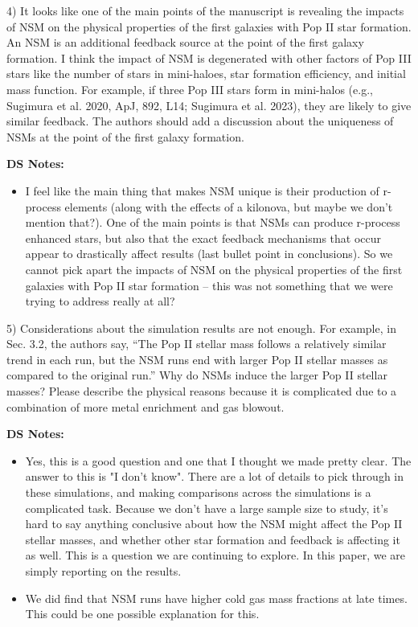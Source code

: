 \documentclass[11pt]{article}
\begin{document}
\begin{tcolorbox}[colback={lightgray}]
    4)      It looks like one of the main points of the manuscript is revealing the impacts of NSM on the physical properties of the first galaxies with Pop II star formation. An NSM is an additional feedback source at the point of the first galaxy formation. I think the impact of NSM is degenerated with other factors of Pop III stars like the number of stars in mini-haloes, star formation efficiency, and initial mass function. For example, if three Pop III stars form in mini-halos (e.g., Sugimura et al. 2020, ApJ, 892, L14; Sugimura et al. 2023), they are likely to give similar feedback. The authors should add a discussion about the uniqueness of NSMs at the point of the first galaxy formation.
\end{tcolorbox}

\textbf{DS Notes:}
\begin{itemize}
    \item I feel like the main thing that makes NSM unique is their production of r-process elements (along with the effects of a kilonova, but maybe we don't mention that?). One of the main points is that NSMs can produce r-process enhanced stars, but also that the exact feedback mechanisms that occur appear to drastically affect results (last bullet point in conclusions). So we cannot pick apart the impacts of NSM on the physical properties of the first galaxies with Pop II star formation -- this was not something that we were trying to address really at all?
\end{itemize}

\begin{tcolorbox}[colback={lightgray}] 
    5)      Considerations about the simulation results are not enough. For example, in Sec. 3.2, the authors say, “The Pop II stellar mass follows a relatively similar trend in each run, but the NSM runs end with larger Pop II stellar masses as compared to the original run.” Why do NSMs induce the larger Pop II stellar masses? Please describe the physical reasons because it is complicated due to a combination of more metal enrichment and gas blowout.
\end{tcolorbox}

\textbf{DS Notes:}
\begin{itemize}
    \item Yes, this is a good question and one that I thought we made pretty clear. The answer to this is "I don't know". There are a lot of details to pick through in these simulations, and making comparisons across the simulations is a complicated task. Because we don't have a large sample size to study, it's hard to say anything conclusive about how the NSM might affect the Pop II stellar masses, and whether other star formation and feedback is affecting it as well. This is a question we are continuing to explore. In this paper, we are simply reporting on the results.
    \item We did find that NSM runs have higher cold gas mass fractions at late times. This could be one possible explanation for this.
\end{itemize}
\end{document}
